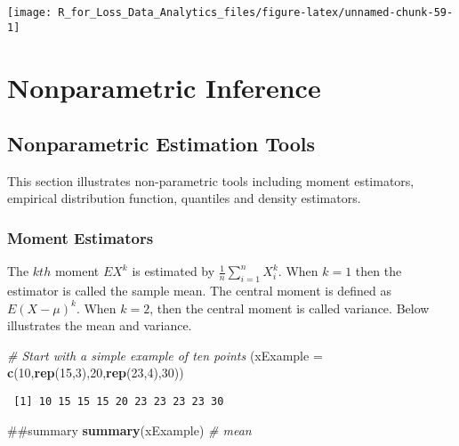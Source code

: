 \documentclass[]{book}
\newenvironment{Shaded}{\begin{snugshade}}{\end{snugshade}}
\newcommand{\KeywordTok}[1]{\textcolor[rgb]{0.13,0.29,0.53}{\textbf{#1}}}
\newcommand{\DataTypeTok}[1]{\textcolor[rgb]{0.13,0.29,0.53}{#1}}
\newcommand{\DecValTok}[1]{\textcolor[rgb]{0.00,0.00,0.81}{#1}}
\newcommand{\CommentTok}[1]{\textcolor[rgb]{0.56,0.35,0.01}{\textit{#1}}}
\newcommand{\NormalTok}[1]{#1}
\theoremstyle{definition}
\theoremstyle{definition}
\theoremstyle{definition}
\theoremstyle{remark}
\begin{document}
\begin{center}\texttt{[image: R\_for\_Loss\_Data\_Analytics\_files/figure-latex/unnamed-chunk-59-1]} \end{center}

\section{Nonparametric Inference}\label{nonparametric-inference}

\subsection{Nonparametric Estimation
Tools}\label{nonparametric-estimation-tools}

This section illustrates non-parametric tools including moment
estimators, empirical distribution function, quantiles and density
estimators.

\subsubsection{Moment Estimators}\label{moment-estimators}

The \(kth\) moment \(EX^k\) is estimated by
\(\frac{1}{n}\sum_{i=1}^{n}X_i^k\). When \(k=1\) then the estimator is
called the sample mean. The central moment is defined as \(E(X-\mu)^k\).
When \(k=2\), then the central moment is called variance. Below
illustrates the mean and variance.

\begin{Shaded}
\begin{Highlighting}[]
\CommentTok{# Start with a simple example of ten points}
\NormalTok{(}\DataTypeTok{xExample =} \KeywordTok{c}\NormalTok{(}\DecValTok{10}\NormalTok{,}\KeywordTok{rep}\NormalTok{(}\DecValTok{15}\NormalTok{,}\DecValTok{3}\NormalTok{),}\DecValTok{20}\NormalTok{,}\KeywordTok{rep}\NormalTok{(}\DecValTok{23}\NormalTok{,}\DecValTok{4}\NormalTok{),}\DecValTok{30}\NormalTok{))}
\end{Highlighting}
\end{Shaded}

\begin{verbatim}
 [1] 10 15 15 15 20 23 23 23 23 30
\end{verbatim}

\begin{Shaded}
\begin{Highlighting}[]
\NormalTok{##summary}
\KeywordTok{summary}\NormalTok{(xExample) }\CommentTok{# mean }
\end{Highlighting}
\end{Shaded}
\end{document}
